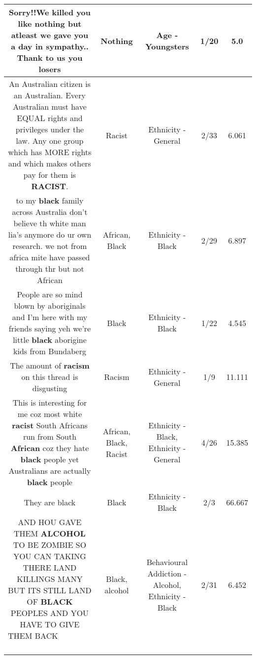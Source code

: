 \documentclass[11pt]{article}
\newlength\mylength
\begin{document}
\begin{center}
\begin{longtable}{|C{.65\mylength}|C{.30\mylength}|C{.12\mylength}|C{.12\mylength}|C{.12\mylength}|}
  \small Sorry!!We killed you like \textbf{nothing} but atleast we gave you a day in sympathy.. Thank to us you losers\normalsize   & Nothing & Age - Youngsters & 1/20 & 5.0 \\  \hline
  \small An Australian citizen is an Australian.  Every Australian must have EQUAL rights and privileges under the law.  Any one group which has MORE rights and which makes others pay for them is \textbf{RACIST}.\normalsize   & Racist & Ethnicity - General & 2/33 & 6.061 \\  \hline
  \small to my \textbf{black} family across Australia don't believe th white man lia's anymore do ur own research. we not from africa mite have passed through thr but not African\normalsize   & African, Black & Ethnicity - Black & 2/29 & 6.897 \\  \hline
  \small People are so mind blown by aboriginals and I'm here with my friends saying yeh we're little \textbf{black} aborigine kids from Bundaberg\normalsize   & Black & Ethnicity - Black & 1/22 & 4.545 \\  \hline
  \small The amount of \textbf{racism} on this thread is disgusting\normalsize   & Racism & Ethnicity - General & 1/9 & 11.111 \\  \hline
  \small This is interesting for me coz most white \textbf{racist} South Africans run from South \textbf{African} coz they hate \textbf{black} people yet Australians are actually \textbf{black} people\normalsize   & African, Black, Racist & Ethnicity - Black, Ethnicity - General & 4/26 & 15.385 \\  \hline
  \small They are black\normalsize   & Black & Ethnicity - Black & 2/3 & 66.667 \\  \hline
  \small AND HOU GAVE THEM \textbf{ALCOHOL} TO BE ZOMBIE SO YOU CAN TAKING THERE LAND KILLINGS MANY  BUT ITS STILL LAND OF \textbf{BLACK} PEOPLES AND YOU HAVE TO GIVE THEM BACK  👹👹👹👹👹👹👹👹👹👹👹👹👹😇😇😇😇😇😇😇😇😇😇\normalsize   & Black, alcohol & Behavioural Addiction - Alcohol, Ethnicity - Black & 2/31 & 6.452 \\  \hline

\end{longtable}
\end{center}
\end{document}
